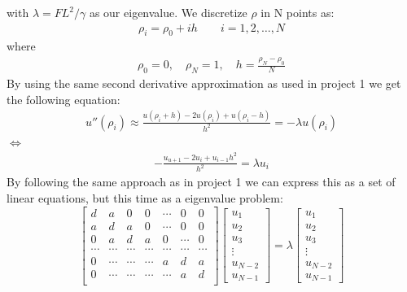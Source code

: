 \documentclass[american,a4paper,12pt]{article}
\begin{document}
with $\lambda = FL^2/\gamma$ as our eigenvalue. We discretize $\rho$ in N points as:
\begin{align*}
    \rho_i = \rho_0 + ih \quad \quad i = 1, 2, \hdots, N 
\end{align*}
where
\begin{align*}
    \rho_0 = 0, \quad \rho_N = 1, \quad h = \frac{\rho_N - \rho_0}{N}
\end{align*}
By using the same second derivative approximation as used in project 1 \cite{project1} we get the following equation:
\begin{align*}
    u''(\rho_i) \approx \frac{u(\rho_i + h) - 2u(\rho_i) + u(\rho_i - h)}{h^2} =- \lambda u(\rho_i)
\end{align*}
$\Longleftrightarrow$
\begin{align*}
    -\frac{u_{u+1} - 2u_i + u_{i-1}{h^2}}{h^2} =   \lambda u_i
\end{align*}
By following the same approach as in project 1 \cite{project1} we can express this as a set of linear equations, but this time as a eigenvalue problem:
\begin{equation}
     \begin{bmatrix}
        d & a & 0 & 0 & \cdots & 0 & 0 \\
        a & d & a & 0 & \cdots & 0 & 0 \\
        0 & a & d & a & 0 & \cdots & 0 \\
        \cdots & \cdots & \cdots & \cdots & \cdots & \cdots & \cdots \\
        0 & \cdots & \cdots & \cdots & a & d & a \\
        0 & \cdots & \cdots & \cdots & \cdots & a & d \\
    \end{bmatrix}
    \begin{bmatrix}
    u_1 \\
    u_2 \\
    u_3 \\
    \vdots \\
    u_{N-2} \\
    u_{N-1}
    \end{bmatrix}
    = \lambda
    \begin{bmatrix}
    u_1 \\
    u_2 \\
    u_3 \\
    \vdots \\
    u_{N-2} \\
    u_{N-1}
    \end{bmatrix}
    \label{eq:buckling_beam}
\end{equation}
\end{document}
